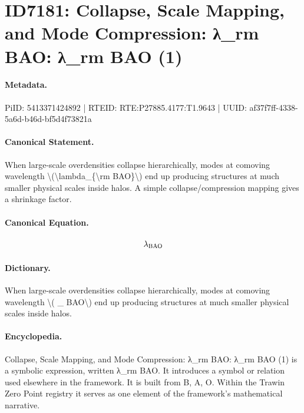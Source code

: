 \section*{ID7181: Collapse, Scale Mapping, and Mode Compression: λ\_rm BAO: λ\_rm BAO (1)}
\paragraph{Metadata.}
PiID: 5413371424892 | RTEID: RTE:P27885.4177:T1.9643 | UUID: af37f7ff-4338-5a6d-b46d-bf5d4f73821a

\paragraph{Canonical Statement.}
When large-scale overdensities collapse hierarchically, modes at comoving wavelength \textbackslash{}(\textbackslash{}lambda\_\{\textbackslash{}rm BAO\}\textbackslash{}) end up producing structures at much smaller physical scales inside halos. A simple collapse/compression mapping gives a shrinkage factor.

\paragraph{Canonical Equation.}
\[
\lambda_{\rm BAO}
\]

\paragraph{Dictionary.}
When large-scale overdensities collapse hierarchically, modes at comoving wavelength \textbackslash{}( \_ BAO\textbackslash{}) end up producing structures at much smaller physical scales inside halos.

\paragraph{Encyclopedia.}
Collapse, Scale Mapping, and Mode Compression: λ\_rm BAO: λ\_rm BAO (1) is a symbolic expression, written λ\_rm BAO. It introduces a symbol or relation used elsewhere in the framework. It is built from B, A, O. Within the Trawin Zero Point registry it serves as one element of the framework's mathematical narrative.
